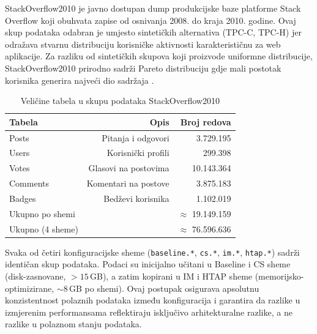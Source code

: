 StackOverflow2010 je javno dostupan dump produkcijske baze platforme Stack Overflow koji obuhvata zapise od osnivanja 2008. do kraja 2010. godine. Ovaj skup podataka odabran je umjesto sintetičkih alternativa (TPC-C, TPC-H) jer odražava stvarnu distribuciju korisničke aktivnosti karakterističnu za web aplikacije. Za razliku od sintetičkih skupova koji proizvode uniformne distribucije, StackOverflow2010 prirodno sadrži Pareto distribuciju gdje mali postotak korisnika generira najveći dio sadržaja \cite{zhang2024htap}.
\begin{table}[htbp]
\centering
\caption{Veličine tabela u skupu podataka StackOverflow2010}
\label{tab:podaci}
\small
\begin{tabular}{lrr}
\toprule
\textbf{Tabela} & \textbf{Opis} & \textbf{Broj redova} \\
\midrule
Posts & Pitanja i odgovori & 3.729.195 \\
Users & Korisnički profili & 299.398 \\
Votes & Glasovi na postovima & 10.143.364 \\
Comments & Komentari na postove & 3.875.183 \\
Badges & Bedževi korisnika & 1.102.019 \\
\midrule
Ukupno po shemi & & $\approx$ 19.149.159 \\
Ukupno (4 sheme) & & $\approx$ 76.596.636 \\
\bottomrule
\end{tabular}
\end{table}

Svaka od četiri konfiguracijske sheme (\texttt{baseline.*}, \texttt{cs.*}, \texttt{im.*}, \texttt{htap.*}) sadrži identičan skup podataka. Podaci su inicijalno učitani u Baseline i CS sheme (disk-zasnovane, $>15$\,GB), a zatim kopirani u IM i HTAP sheme (memorijsko-optimizirane, $\sim$8\,GB po shemi). Ovaj postupak osigurava apsolutnu konzistentnost polaznih podataka između konfiguracija i garantira da razlike u izmjerenim performansama reflektiraju isključivo arhitekturalne razlike, a ne razlike u polaznom stanju podataka.
